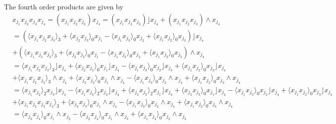 \documentclass[aps, preprint]{revtex4}
\begin{document}
The fourth order products are given by
\begin{align} & x_{j_{1}} x_{j_{2}} x_{j_{3}} x_{j_{4}} =\left (x_{j_{1}} x_{j_{2}} x_{j_{3}}\right ) x_{j_{4}} =\left (x_{j_{1}} x_{j_{2}} x_{j_{3}}\right )\rfloor x_{j_{4}} +\left (x_{j_{1}} x_{j_{2}} x_{j_{3}}\right ) \wedge x_{j_{4}} \nonumber  \\
 &  =\left ( \langle x_{j_{1}} x_{j_{2}} x_{j_{3}} \rangle _{3} + \langle x_{j_{2}} x_{j_{3}} \rangle _{0} x_{j_{1}} - \langle x_{j_{1}} x_{j_{3}} \rangle _{0} x_{j_{2}} + \langle x_{j_{1}} x_{j_{2}} \rangle _{0} x_{j_{3}}\right )\rfloor x_{j_{4}} \nonumber  \\
 &  +\left ( \langle x_{j_{1}} x_{j_{2}} x_{j_{3}} \rangle _{3} + \langle x_{j_{2}} x_{j_{3}} \rangle _{0} x_{j_{1}} - \langle x_{j_{1}} x_{j_{3}} \rangle _{0} x_{j_{2}} + \langle x_{j_{1}} x_{j_{2}} \rangle _{0} x_{j_{3}}\right ) \wedge x_{j_{4}} \\
 &  = \langle x_{j_{1}} x_{j_{2}} x_{j_{3}} \rangle _{3}\rfloor x_{j_{4}} + \langle x_{j_{2}} x_{j_{3}} \rangle _{0} x_{j_{1}}\rfloor x_{j_{4}} - \langle x_{j_{1}} x_{j_{3}} \rangle _{0} x_{j_{2}}\rfloor x_{j_{4}} + \langle x_{j_{1}} x_{j_{2}} \rangle _{0} x_{j_{3}}\rfloor x_{j_{4}} \nonumber  \\
 &  + \langle x_{j_{1}} x_{j_{2}} x_{j_{3}} \rangle _{3} \wedge x_{j_{4}} + \langle x_{j_{2}} x_{j_{3}} \rangle _{0} x_{j_{1}} \wedge x_{j_{4}} - \langle x_{j_{1}} x_{j_{3}} \rangle _{0} x_{j_{2}} \wedge x_{j_{4}} + \langle x_{j_{1}} x_{j_{2}} \rangle _{0} x_{j_{3}} \wedge x_{j_{4}} \nonumber  \\
 &  = \langle x_{j_{1}} x_{j_{2}} \rangle _{2} x_{j_{3}}\rfloor x_{j_{4}} - \langle x_{j_{1}} x_{j_{3}} \rangle _{2} x_{j_{2}}\rfloor x_{j_{4}} + \langle x_{j_{2}} x_{j_{3}} \rangle _{2} x_{j_{1}}\rfloor x_{j_{4}} + \langle x_{j_{2}} x_{j_{3}} \rangle _{0} x_{j_{1}}\rfloor x_{j_{4}} - \langle x_{j_{1}} x_{j_{3}} \rangle _{0} x_{j_{2}}\rfloor x_{j_{4}} + \langle x_{j_{1}} x_{j_{2}} \rangle _{0} x_{j_{3}}\rfloor x_{j_{4}} \nonumber  \\
 &  + \langle x_{j_{1}} x_{j_{2}} x_{j_{3}} x_{j_{4}} \rangle _{3} + \langle x_{j_{2}} x_{j_{3}} \rangle _{0} x_{j_{1}} \wedge x_{j_{4}} - \langle x_{j_{1}} x_{j_{3}} \rangle _{0} x_{j_{2}} \wedge x_{j_{4}} + \langle x_{j_{1}} x_{j_{2}} \rangle _{0} x_{j_{3}} \wedge x_{j_{4}} \nonumber  \\
 &  = \langle x_{j_{3}} x_{j_{4}} \rangle _{0} x_{j_{1}} \wedge x_{j_{2}} - \langle x_{j_{2}} x_{j_{4}} \rangle _{0} x_{j_{1}} \wedge x_{j_{3}} + \langle x_{j_{1}} x_{j_{4}} \rangle _{0} x_{j_{2}} \wedge x_{j_{3}} \nonumber  \\

\end{align}
\end{document}
